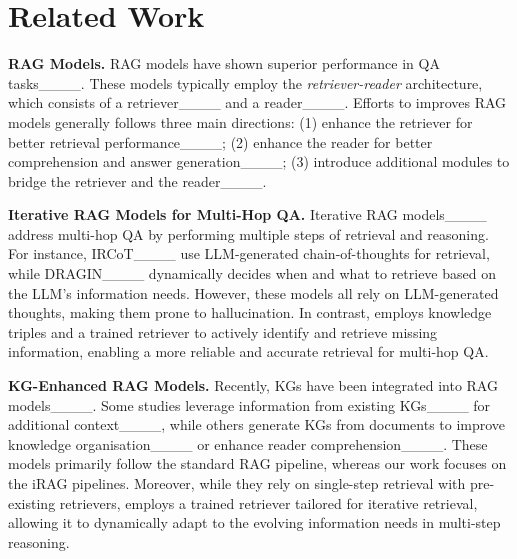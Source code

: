 \section{Related Work}
\textbf{RAG Models.} 
RAG models have shown superior performance in QA tasks____. 
These models typically employ the \textit{retriever-reader} architecture, which consists of a retriever____ %
and a reader____. 
Efforts to improves RAG models generally follows three main directions: 
(1) enhance the retriever for better retrieval performance____; 
(2) enhance the reader for better comprehension and answer generation____; 
(3) introduce additional modules to bridge the retriever and the reader____. 

\vspace{0.5em} \noindent \textbf{Iterative RAG Models for Multi-Hop QA.}
Iterative RAG models____ address multi-hop QA by performing multiple steps of retrieval and reasoning. 
For instance, IRCoT____ use LLM-generated chain-of-thoughts for retrieval, while  DRAGIN____ dynamically decides when and what to retrieve based on the LLM's information needs. 
However, these models all rely on LLM-generated thoughts, making them prone to hallucination. In contrast, \OURS{} employs knowledge triples and a trained retriever to actively identify and retrieve missing information, enabling a more reliable and accurate retrieval for multi-hop QA. 

\vspace{0.5em} \noindent \textbf{KG-Enhanced RAG Models.} 
Recently, KGs have been integrated into RAG models____. Some studies leverage information from existing KGs____ for additional context____, while others generate KGs from documents to improve knowledge organisation____ or enhance reader comprehension____. 
These models primarily follow the standard RAG pipeline, whereas our work focuses on the iRAG pipelines. Moreover, while they rely on single-step retrieval with pre-existing retrievers, \OURS{} employs a trained retriever tailored for iterative retrieval, allowing it to dynamically adapt to the evolving information needs in multi-step reasoning.